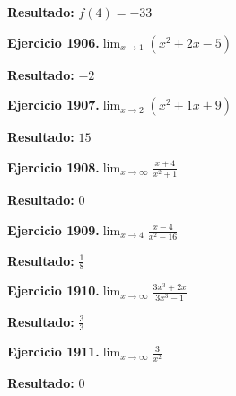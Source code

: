 \documentclass[10pt,a4paper]{article}
\begin{document}
\begin{solbox}
\textbf{Resultado:} \(\displaystyle f(4) = -33\)
\end{solbox}

\newpage
\begin{ejbox}
\textbf{Ejercicio 1906.}\quad $\lim_{x\to 1} (x^2 +2x -5)$
\end{ejbox}

\begin{solbox}
\textbf{Resultado:} \(\displaystyle -2\)
\end{solbox}

\begin{ejbox}
\textbf{Ejercicio 1907.}\quad $\lim_{x\to 2} (x^2 +1x +9)$
\end{ejbox}

\begin{solbox}
\textbf{Resultado:} \(\displaystyle 15\)
\end{solbox}

\begin{ejbox}
\textbf{Ejercicio 1908.}\quad $\lim_{x\to \infty} \frac{x + 4}{x^2 + 1}$
\end{ejbox}

\begin{solbox}
\textbf{Resultado:} \(\displaystyle 0\)
\end{solbox}

\newpage
\begin{ejbox}
\textbf{Ejercicio 1909.}\quad $\lim_{x\to 4} \frac{x-4}{x^2-16}$
\end{ejbox}

\begin{solbox}
\textbf{Resultado:} \(\displaystyle \frac{1}{8}\)
\end{solbox}

\begin{ejbox}
\textbf{Ejercicio 1910.}\quad $\lim_{x\to \infty} \frac{3x^3 + 2x}{3x^3 - 1}$
\end{ejbox}

\begin{solbox}
\textbf{Resultado:} \(\displaystyle \frac{3}{3}\)
\end{solbox}

\begin{ejbox}
\textbf{Ejercicio 1911.}\quad $\lim_{x\to \infty} \frac{3}{x^2}$
\end{ejbox}

\begin{solbox}
\textbf{Resultado:} \(\displaystyle 0\)
\end{solbox}
\end{document}
